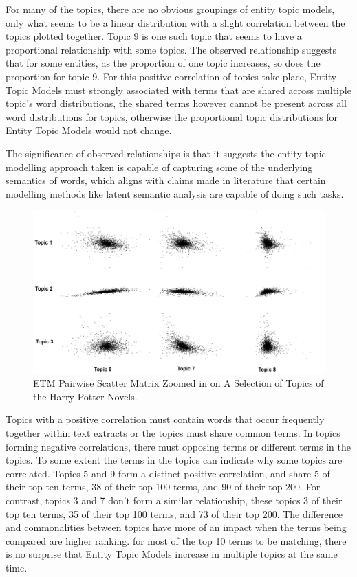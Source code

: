 \documentclass[10pt]{report}
\begin{document}
For many of the topics, there are no obvious groupings of entity topic models, only what seems to be a linear distribution with a slight correlation between the topics plotted together. Topic 9 is one such topic that seems to have a proportional relationship with some topics. The observed relationship suggests that for some entities, as the proportion of one topic increases, so does the proportion for topic 9. For this positive correlation of topics take place, Entity Topic Models must strongly associated with terms that are shared across multiple topic's word distributions, the shared terms however cannot be present across all word distributions for topics, otherwise the proportional topic distributions for Entity Topic Models would not change.

The significance of observed relationships is that it suggests the entity topic modelling approach taken is capable of capturing some of the underlying semantics of words, which aligns with claims made in literature that certain modelling methods like latent semantic analysis are capable of doing such tasks.

\renewcommand{\baselinestretch}{1.0}\normalsize
\renewcommand{\arraystretch}{1.0}
\begin{figure}[h!]
  \centering
  \includegraphics[scale=0.15]{hp_full_etm_closeup}
  \caption{ETM Pairwise Scatter Matrix Zoomed in on A Selection of Topics of the Harry Potter Novels. \label{fig:etm_closeup}}
\end{figure}
\renewcommand{\baselinestretch}{2.0}\normalsize
\renewcommand{\arraystretch}{1.0}

Topics with a positive correlation must contain words that occur frequently together within text extracts or the topics must share common terms. In topics forming negative correlations, there must opposing terms or different terms in the topics. To some extent the terms in the topics can indicate why some topics are correlated. Topics 5 and 9 form a distinct positive correlation, and share 5 of their top ten terms, 38 of their top 100 terms, and 90 of their top 200. For contrast, topics 3 and 7 don't form a similar relationship, these topics 3 of their top ten terms, 35 of their top 100 terms, and 73 of their top 200. The difference and commonalities between topics have more of an impact when the terms being compared are higher ranking. for most of the top 10 terms to be matching, there is no surprise that Entity Topic Models increase in multiple topics at the same time.
\end{document}

